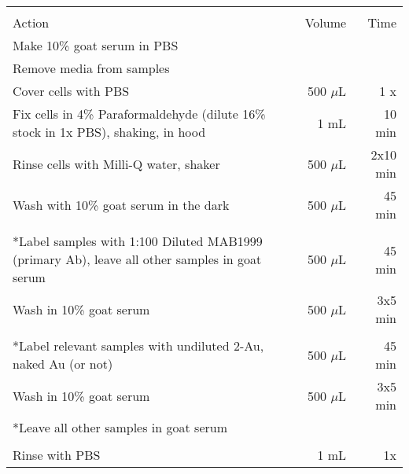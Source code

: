 \begin{table}[htbp]
\begin{minipage}{\linewidth}
\setlength{\tymax}{0.5\linewidth}
\centering
\small
\begin{tabular}{p{4in}rr} \toprule
 \rowcolors{1}{}{lightgray} \\
Action&Volume&Time\\
\midrule
Make 10\% goat serum in PBS&&\\
Remove media from samples&&\\
Cover cells with PBS&500 $\mu$L&1 x\\
Fix cells in 4\% Paraformaldehyde (dilute 16\% stock in 1x PBS), shaking, in hood&1 mL&10 min\\
Rinse cells with Milli-Q water, shaker&500 $\mu$L&2x10 min\\
Wash with 10\% goat serum in the dark&500 $\mu$L&45 min\\
&&\\
*Label samples with 1:100 Diluted MAB1999 (primary Ab), leave all other samples in goat serum&500 $\mu$L&45 min\\
Wash in 10\% goat serum&500 $\mu$L&3x5 min\\
&&\\
*Label relevant samples with undiluted 2-Au, naked Au (or not)&500 $\mu$L&45 min\\
Wash in 10\% goat serum&500 $\mu$L&3x5 min\\
*Leave all other samples in goat serum&&\\
&&\\
Rinse with PBS&1 mL&1x\\

\bottomrule

\end{tabular}
\end{minipage}
\end{table}

